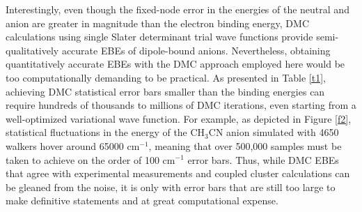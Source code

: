 Interestingly, even though the fixed-node error in the energies of the neutral and anion are greater in magnitude than the electron binding energy, DMC calculations using  single Slater determinant trial wave functions provide semi-qualitatively accurate EBEs of dipole-bound anions. Nevertheless, obtaining quantitatively accurate EBEs with the DMC approach employed here would be too computationally demanding to be practical. As presented in Table \ref{t1}, achieving DMC statistical error bars smaller than the binding energies can require hundreds of thousands to millions of DMC iterations, even starting from a well-optimized variational wave function. For example, as depicted in Figure \ref{f2}, statistical fluctuations in the energy of the CH$_{3}$CN anion simulated with 4650 walkers hover around 65000 cm$^{-1}$, meaning that over 500,000 samples must be taken to achieve on the order of 100 cm$^{-1}$ error bars. Thus, while DMC EBEs that agree with experimental measurements and coupled cluster calculations can be gleaned from the noise, it is only with error bars that are still too large to make definitive statements and at great computational expense.
